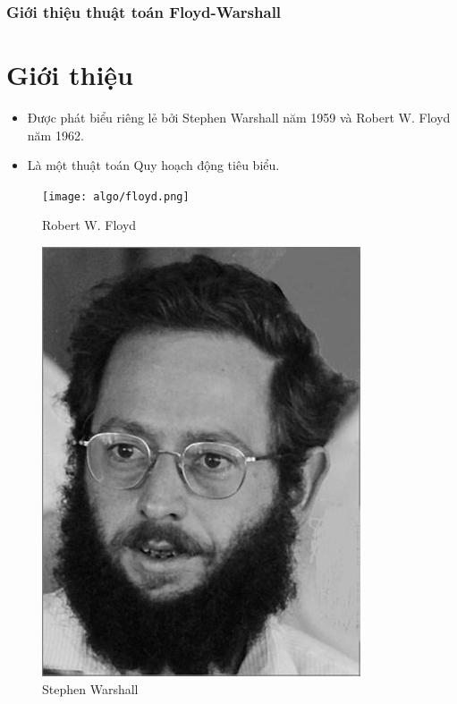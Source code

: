 \documentclass[12pt]{beamer}
\begin{document}
    \begin{frame}[t]
        \frametitle{Giới thiệu thuật toán Floyd-Warshall}
        \section{Giới thiệu}

        \begin{itemize}
            \item Được phát biểu riêng lẻ bởi Stephen Warshall năm 1959 và Robert W. Floyd năm 1962.
            \item Là một thuật toán Quy hoạch động tiêu biểu.
        \end{itemize}

        \begin{minipage}{0.45\textwidth}
        \begin{figure}
            \texttt{[image: algo/floyd.png]}
            \caption{Robert W. Floyd}
        \end{figure}
        \end{minipage}
        \begin{minipage}{0.45\textwidth}
        \begin{figure}
            \includegraphics[scale=2]{algo/warshall.jpg}
            \caption{Stephen Warshall}
        \end{figure}
        \end{minipage}
    \end{frame}
\end{document}
